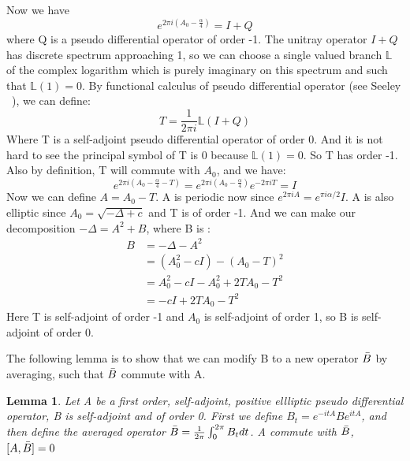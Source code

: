 \documentclass[10pt]{amsart}
\newtheorem{lemma}[theorem]{Lemma}
\newcommand{\1}{\mathbb{1}}
\begin{document}
Now we have 
\begin{equation*}
    e^{2\pi i (A_0-\frac{\alpha}{4})} = I + Q
\end{equation*}
where Q is a pseudo differential operator of order -1. The unitray operator $I+Q$ has discrete spectrum approaching 1, so we can choose a single valued branch $\mathbb{L}$ of the complex logarithm which is purely imaginary on this spectrum and such that $\mathbb{L}(1)= 0$. By functional calculus of pseudo differential operator (see Seeley ~\cite{Seeley1967ComplexPO}), we can define:
\begin{equation*}
    T = \frac{1}{2\pi i} \mathbb{L} (I+Q)
\end{equation*}
Where T is  a self-adjoint pseudo differential operator of order 0. And it is not hard to see the principal symbol of T is 0 because $\mathbb{L}(1) = 0$. So T has order -1. Also by definition, T will commute with $A_0$, and we have:
\begin{equation*}
    e^{2\pi i (A_0-\frac{\alpha}{4}-T)} = e^{2\pi i (A_0-\frac{\alpha}{4})} e^{-2\pi i T} = I
\end{equation*}
Now we can define $A = A_0 - T$. A is periodic now since $e^{2\pi i A} = e^{\pi i \alpha /2} I$. A is also elliptic since $A_0 = \sqrt{-\Delta + c}$ and T is of order -1. And we can make our decomposition $-\Delta = A^2 + B$, where B is :
\begin{align*}
    B &= -\Delta - A^2\\
      &= (A_0^2 - cI) - (A_0 -T)^2\\
      &= A_0^2 - cI - A_0^2 + 2TA_0 - T^2\\
      &= -cI + 2TA_0 - T^2
\end{align*}
Here T is self-adjoint of order -1 and $A_0$ is self-adjoint of order 1, so B is self-adjoint of order 0.

The following lemma is to show that we can modify B to a new operator $\Bar{B}$ by averaging, such that $\Bar{B}$ commute with A.
\begin{lemma}\label{com}
    Let A be a first order, self-adjoint, positive ellliptic pseudo differential operator, B is self-adjoint and of order 0. First we define $B_t = e^{-itA} B e^{itA}$, and then define the averaged operator $\Bar{B} = \frac{1}{2\pi}\int_0^{2\pi}B_t dt$. A commute with $\Bar{B}$,  $[A,\Bar{B}] = 0$
\end{lemma}
\end{document}
